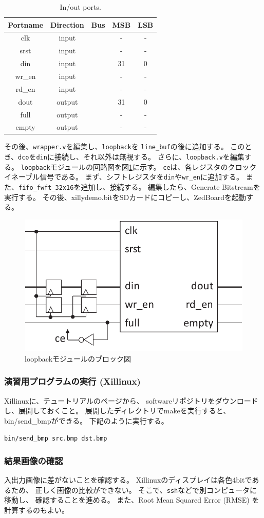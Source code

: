 \documentclass[11pt]{jsarticle}
\begin{document}
\begin{table}[ht]%
	\caption{In/out ports.}
	\label{tbl:inout}
	\begin{center}
		\begin{tabular}{ccccc}
			\hline
			Portname & Direction & Bus & MSB & LSB \\
			\hline \hline
			clk & input &   & - & - \\
			srst & input &   & - & - \\
			din & input & \checkmark & 31 & 0 \\
			wr\_en & input &   & - & - \\
			rd\_en & input &   & - & - \\
			dout & output & \checkmark & 31 & 0 \\
			full & output &   & - & - \\
			empty & output &   & - & - \\
			\hline
		\end{tabular}%
	\end{center}
\end{table}

その後、\verb|wrapper.v|を編集し、\verb|loopback|を
\verb|line_buf|の後に追加する。
このとき、\verb|dco|を\verb|din|に接続し、それ以外は無視する。
さらに、\verb|loopback.v|を編集する。
\verb|loopback|モジュールの回路図を図\ref{img:loopback}に示す。
\verb|ce|は、各レジスタのクロックイネーブル信号である。
まず、シフトレジスタを\verb|din|や\verb|wr_en|に追加する。
また、\verb|fifo_fwft_32x16|を追加し、接続する。
編集したら、Generate Bitstreamを実行する。
その後、xillydemo.bitをSDカードにコピーし、ZedBoardを起動する。

\begin{figure}[ht]
	\centering
	\includegraphics[width=0.5\linewidth]{img/loopback.pdf}
	\caption{loopbackモジュールのブロック図}
	\label{img:loopback}
\end{figure}

\vspace{-0.5cm}

\subsubsection*{演習用プログラムの実行 (Xillinux)}
Xillinuxに、チュートリアルのページから、
softwareリポジトリをダウンロードし、展開しておくこと。
展開したディレクトリでmakeを実行すると、
bin/send\_bmpができる。
下記のように実行する。

\begin{center}
	\verb|bin/send_bmp src.bmp dst.bmp|
\end{center}

\subsubsection*{結果画像の確認}
入出力画像に差がないことを確認する。
Xillinuxのディスプレイは各色4bitであるため、
正しく画像の比較ができない。
そこで、\verb|ssh|などで別コンピュータに移動し、
確認することを進める。
また、Root Mean Squared Error (RMSE) を計算するのもよい。
\end{document}
